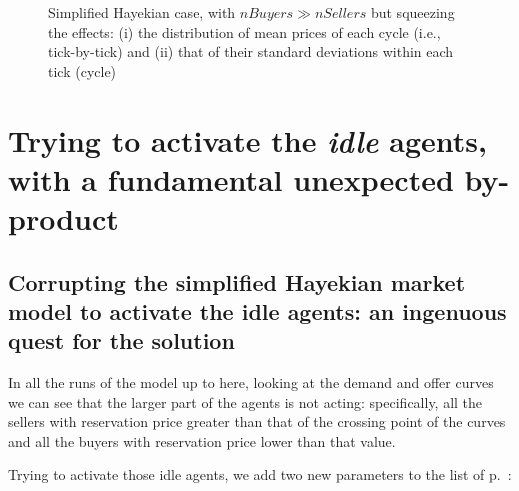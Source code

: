 \documentclass[10pt]{report}
\begin{document}
\begin{appendices}
\begin{figure}[H]
\begin{center}
\caption{Simplified Hayekian case, with $nBuyers \gg nSellers$ but squeezing the effects: (i) the distribution of mean prices of each cycle (i.e., tick-by-tick) and (ii) that of their standard deviations within each tick (cycle)}
\label{output_3_3bbb.png}
\end{center}
\end{figure}


\chapter{Trying to activate the \emph{idle} agents, with a fundamental unexpected by-product}\label{Activating idle agents}
\thispagestyle{fancy}

\section{Corrupting the simplified Hayekian market model to activate the idle agents: an ingenuous quest for the solution}\label{Corrupting the simplified Hayekian - base}

In all the runs of the model up to here, looking at the demand and offer curves we can see that the larger part of the agents is not acting: specifically, all the sellers with reservation price greater than that of the crossing point of the curves and all the buyers with reservation price lower than that value.

Trying to activate those idle agents, we add two new parameters to the list of p.~\pageref{parameters}:


\end{appendices}
\end{document}
